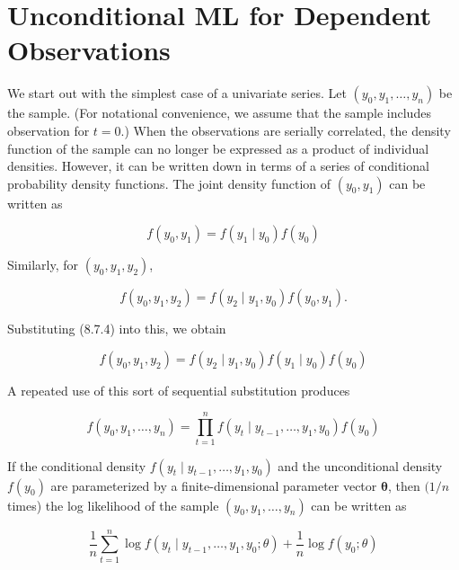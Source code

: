 \documentclass[10pt]{article}
\begin{document}
\section*{Unconditional ML for Dependent Observations}
We start out with the simplest case of a univariate series. Let $\left(y_{0}, y_{1}, \ldots, y_{n}\right)$ be the sample. (For notational convenience, we assume that the sample includes observation for $t=0$.) When the observations are serially correlated, the density function of the sample can no longer be expressed as a product of individual densities. However, it can be written down in terms of a series of conditional probability density functions. The joint density function of $\left(y_{0}, y_{1}\right)$ can be written as


\begin{equation*}
f\left(y_{0}, y_{1}\right)=f\left(y_{1} \mid y_{0}\right) f\left(y_{0}\right) \tag{8.7.4}
\end{equation*}


Similarly, for $\left(y_{0}, y_{1}, y_{2}\right)$,


\begin{equation*}
f\left(y_{0}, y_{1}, y_{2}\right)=f\left(y_{2} \mid y_{1}, y_{0}\right) f\left(y_{0}, y_{1}\right) . \tag{8.7.5}
\end{equation*}


Substituting (8.7.4) into this, we obtain


\begin{equation*}
f\left(y_{0}, y_{1}, y_{2}\right)=f\left(y_{2} \mid y_{1}, y_{0}\right) f\left(y_{1} \mid y_{0}\right) f\left(y_{0}\right) \tag{8.7.6}
\end{equation*}


A repeated use of this sort of sequential substitution produces


\begin{equation*}
f\left(y_{0}, y_{1}, \ldots, y_{n}\right)=\prod_{t=1}^{n} f\left(y_{t} \mid y_{t-1}, \ldots, y_{1}, y_{0}\right) f\left(y_{0}\right) \tag{8.7.7}
\end{equation*}


If the conditional density $f\left(y_{t} \mid y_{t-1}, \ldots, y_{1}, y_{0}\right)$ and the unconditional density $f\left(y_{0}\right)$ are parameterized by a finite-dimensional parameter vector $\boldsymbol{\theta}$, then $(1 / n$ times) the log likelihood of the sample $\left(y_{0}, y_{1}, \ldots, y_{n}\right)$ can be written as


\begin{equation*}
\frac{1}{n} \sum_{t=1}^{n} \log f\left(y_{t} \mid y_{t-1}, \ldots, y_{1}, y_{0} ; \theta\right)+\frac{1}{n} \log f\left(y_{0} ; \theta\right) \tag{8.7.8}
\end{equation*}
\end{document}
